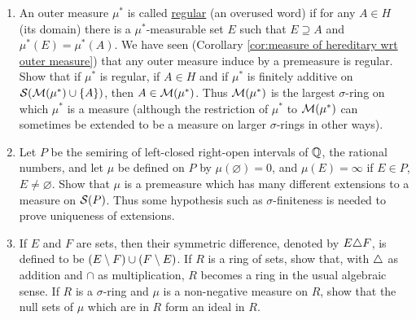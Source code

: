 \begin{enumerate}[label=\arabic*),ref=\arabic*]
\item An outer measure $\mu^*$ is called \underline{regular} (an overused word) if for any $A\in H$ (its domain) there is a $\mu^*$-measurable set $E$ such that $E\supseteq A$ and $\mu^*(E)=\mu^*(A)$. We have seen (Corollary \ref{cor:measure of hereditary wrt outer measure}) that any outer measure induce by a premeasure is regular. Show that if $\mu^*$ is regular, if $A\in H$ and if $\mu^*$ is finitely additive on ${\cal S}({\cal M}(\mu^*)\cup\left\{A\right\})$, then $A\in{\cal M}(\mu^*)$. Thus ${\cal M}(\mu^*)$ is the largest $\sigma$-ring on which $\mu^*$ is a measure (although the restriction of $\mu^*$ to ${\cal M}(\mu^*)$ can sometimes be extended to be a measure on larger $\sigma$-rings in other ways).

\item \label{exer:non unique extension measure} Let $P$ be the semiring of left-closed right-open intervals of $\mathbb{Q}$, the rational numbers, and let $\mu$ be defined on $P$ by $\mu(\varnothing)=0$, and $\mu(E)=\infty$ if $E\in P$, $E\neq\varnothing$. Show that $\mu$ is a premeasure which has many different extensions to a measure on ${\cal S}(P)$. Thus some hypothesis such as $\sigma$-finiteness is needed to prove uniqueness of extensions.

\item \label{exer:null set as ideal}
If $E$ and $F$ are sets, then their symmetric difference, denoted by $E\triangle F$, is defined to be $(E\setminus F)\cup(F\setminus E)$. If $R$ is a ring of sets, show that, with $\triangle$ as addition and $\cap$ as multiplication, $R$ becomes a ring in the usual algebraic sense. If $R$ is a $\sigma$-ring and $\mu$ is a non-negative measure on $R$, show that the null sets of $\mu$ which are in $R$ form an ideal in $R$.


\end{enumerate}
